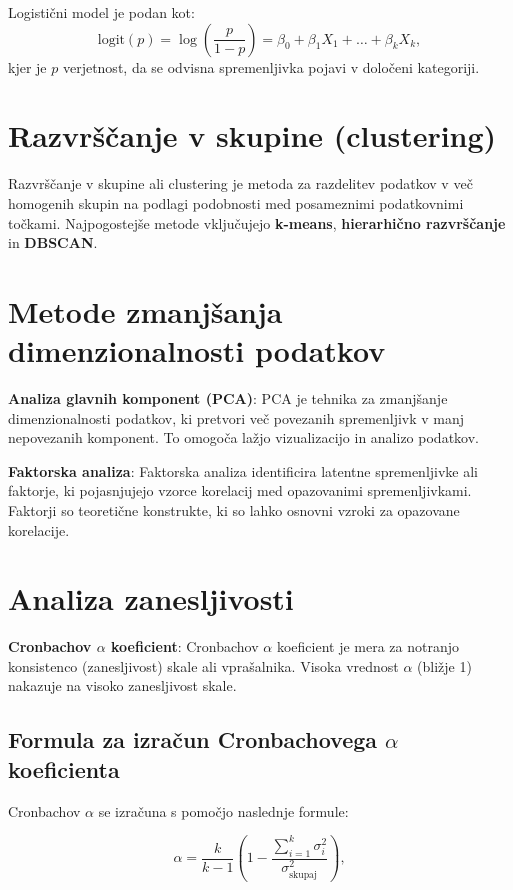 Logistični model je podan kot:
\[\text{logit}(p) = \log\left(\frac{p}{1-p}\right) = \beta_0 + \beta_1 X_1 + \ldots + \beta_k X_k,\]
kjer je $p$ verjetnost, da se odvisna spremenljivka pojavi v določeni kategoriji.

\section{Razvrščanje v skupine (clustering)}

Razvrščanje v skupine ali clustering je metoda za razdelitev podatkov v več homogenih skupin na podlagi podobnosti med posameznimi podatkovnimi točkami. Najpogostejše metode vključujejo \textbf{k-means}, \textbf{hierarhično razvrščanje} in \textbf{DBSCAN}.

\section{Metode zmanjšanja dimenzionalnosti podatkov}

\textbf{Analiza glavnih komponent (PCA)}:
PCA je tehnika za zmanjšanje dimenzionalnosti podatkov, ki pretvori več povezanih spremenljivk v manj nepovezanih komponent. To omogoča lažjo vizualizacijo in analizo podatkov.

\textbf{Faktorska analiza}:
Faktorska analiza identificira latentne spremenljivke ali faktorje, ki pojasnjujejo vzorce korelacij med opazovanimi spremenljivkami. Faktorji so teoretične konstrukte, ki so lahko osnovni vzroki za opazovane korelacije.

\section{Analiza zanesljivosti}

\textbf{Cronbachov $\alpha$ koeficient}:
Cronbachov $\alpha$ koeficient je mera za notranjo konsistenco (zanesljivost) skale ali vprašalnika. Visoka vrednost $\alpha$ (bližje 1) nakazuje na visoko zanesljivost skale.

\subsection*{Formula za izračun Cronbachovega $\alpha$ koeficienta}

Cronbachov $\alpha$ se izračuna s pomočjo naslednje formule:

\[\alpha = \frac{k}{k - 1} \left(1 - \frac{\sum_{i=1}^{k} \sigma^2_{i}}{\sigma^2_{\text{skupaj}}}\right),\]

